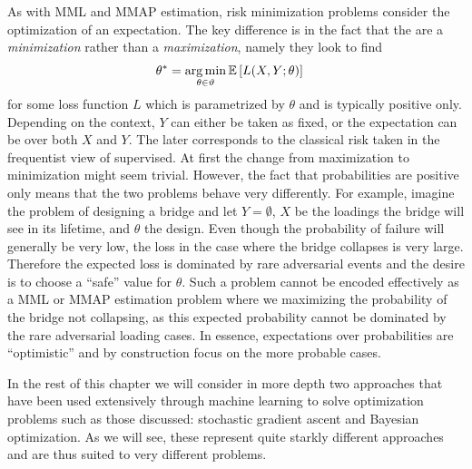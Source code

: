 As with MML and MMAP estimation, risk minimization problems consider the optimization
of an expectation.  The key difference is in the fact that the are a \textit{minimization} rather
than a \textit{maximization}, namely they look to find
\begin{align}
\label{eq:opt:riskmin}
\theta^* &= \operatorname*{arg\,min}_{\theta \in \vartheta}  \mathbb{E} \left[L(X,Y;\theta)\right]
\end{align}
for some loss function $L$ which is parametrized by $\theta$ and is typically positive only.
Depending on the context, $Y$ can either be taken as fixed, or the expectation can be over
both $X$ and $Y$.  The later corresponds to the classical risk taken in the frequentist view
of supervised.
At first the change from
maximization to minimization might seem trivial.  However,
the fact that probabilities are positive only means that the two problems behave very
differently.  For example, imagine the problem of designing a bridge and let 
$Y=\emptyset$, $X$ be the loadings the bridge will see in its lifetime, and $\theta$
the design.  Even though the probability of failure will generally be very low, the
loss in the case where the bridge collapses is very large.  Therefore the expected loss
is dominated by rare adversarial events and the desire is to choose a ``safe'' value for
$\theta$.  Such a problem cannot be encoded effectively as a MML or MMAP estimation
problem where we maximizing the probability of the bridge not collapsing,
as this expected probability cannot be dominated by the rare adversarial loading cases.
In essence, expectations over probabilities are ``optimistic'' and by construction
focus on the more probable cases.

In the rest of this chapter we will consider in more depth two approaches that have been used
extensively through machine learning to solve optimization problems such as those 
discussed: stochastic gradient ascent and Bayesian optimization.  As we will see, these
represent quite starkly different approaches and are thus suited to very different problems.
